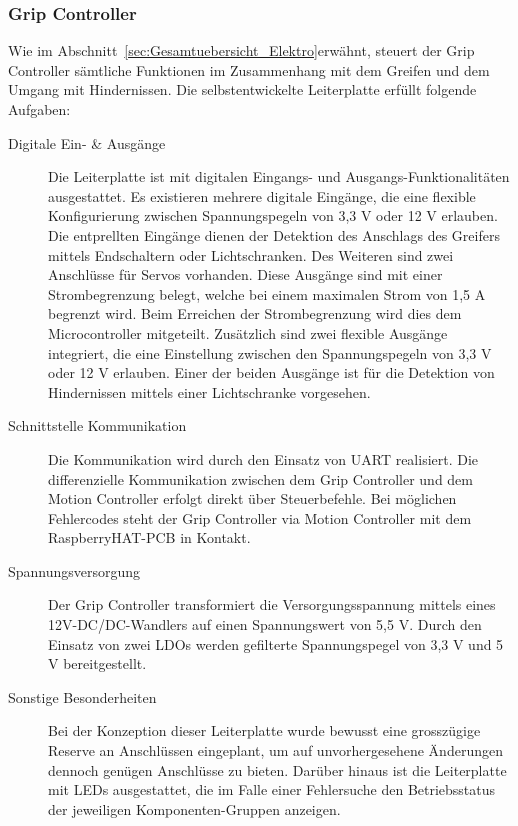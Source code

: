 \documentclass[main.tex]{subfiles} %
\begin{document}

\subsubsection{Grip Controller}
Wie im Abschnitt~\ref{sec:Gesamtuebersicht_Elektro}erwähnt, steuert der Grip
Controller sämtliche Funktionen im Zusammenhang mit dem Greifen und dem Umgang
mit Hindernissen. Die selbstentwickelte Leiterplatte erfüllt folgende Aufgaben:

\begin{description}
      \item[Digitale Ein- \& Ausgänge] Die Leiterplatte ist mit digitalen Eingangs- und
            Ausgangs-Funktionalitäten ausgestattet. Es existieren mehrere digitale
            Eingänge, die eine flexible Konfigurierung zwischen Spannungspegeln von 3,3 V
            oder 12 V erlauben. Die entprellten Eingänge dienen der Detektion des Anschlags
            des Greifers mittels Endschaltern oder Lichtschranken. Des Weiteren sind zwei
            Anschlüsse für Servos vorhanden. Diese Ausgänge sind mit einer Strombegrenzung
            belegt, welche bei einem maximalen Strom von 1,5 A begrenzt wird. Beim
            Erreichen der Strombegrenzung wird dies dem Microcontroller mitgeteilt.
            Zusätzlich sind zwei flexible Ausgänge integriert, die eine Einstellung
            zwischen den Spannungspegeln von 3,3 V oder 12 V erlauben. Einer der beiden
            Ausgänge ist für die Detektion von Hindernissen mittels einer Lichtschranke
            vorgesehen.

      \item[Schnittstelle Kommunikation] Die Kommunikation wird durch den Einsatz von UART
            realisiert. Die differenzielle Kommunikation zwischen dem Grip Controller und
            dem Motion Controller erfolgt direkt über Steuerbefehle. Bei möglichen
            Fehlercodes steht der Grip Controller via Motion Controller mit dem
            RaspberryHAT-PCB in Kontakt.

      \item[Spannungsversorgung] Der Grip Controller transformiert die Versorgungsspannung
            mittels eines 12V-DC/DC-Wandlers auf einen Spannungswert von 5,5 V. Durch den
            Einsatz von zwei LDOs werden gefilterte Spannungspegel von 3,3 V und 5 V
            bereitgestellt.

      \item[Sonstige Besonderheiten] Bei der Konzeption dieser Leiterplatte wurde bewusst
            eine grosszügige Reserve an Anschlüssen eingeplant, um auf unvorhergesehene
            Änderungen dennoch genügen Anschlüsse zu bieten. Darüber hinaus ist die
            Leiterplatte mit LEDs ausgestattet, die im Falle einer Fehlersuche den
            Betriebsstatus der jeweiligen Komponenten-Gruppen anzeigen.
\end{description}
\end{document}
